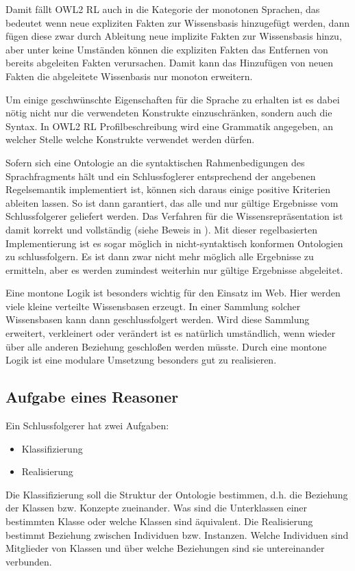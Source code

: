 Damit fällt OWL2 RL auch in die Kategorie der monotonen Sprachen, das bedeutet wenn neue expliziten Fakten zur Wissensbasis hinzugefügt werden, dann fügen diese zwar durch Ableitung neue implizite Fakten zur Wissensbasis hinzu, aber unter keine Umständen können die expliziten Fakten das Entfernen von bereits abgeleiten Fakten verursachen. Damit kann das Hinzufügen von neuen Fakten die abgeleitete Wissenbasis nur monoton erweitern.

Um einige geschwünschte Eigenschaften für die Sprache zu erhalten ist es dabei nötig nicht nur die verwendeten Konstrukte einzuschränken, sondern auch die Syntax. In OWL2 RL Profilbeschreibung wird eine Grammatik angegeben, an welcher Stelle welche Konstrukte verwendet werden dürfen.

Sofern sich eine Ontologie an die syntaktischen Rahmenbedigungen des Sprachfragments hält und ein Schlussfoglerer entsprechend der angebenen Regelsemantik implementiert ist, können sich daraus einige positive Kriterien ableiten lassen. So ist dann garantiert, das alle und nur gültige Ergebnisse vom Schlussfolgerer geliefert werden. Das Verfahren für die Wissensrepräsentation ist damit korrekt und vollständig (siehe Beweis in \cite{OWL2Profiles}).
Mit dieser regelbasierten Implementierung ist es sogar möglich in nicht-syntaktisch konformen Ontologien zu schlussfolgern. Es ist dann zwar nicht mehr möglich alle Ergebnisse zu ermitteln, aber es werden zumindest weiterhin nur gültige Ergebnisse abgeleitet.

Eine montone Logik ist besonders wichtig für den Einsatz im Web. Hier werden viele kleine verteilte Wissensbasen erzeugt. In einer Sammlung solcher Wissensbasen kann dann geschlussfolgert werden. Wird diese Sammlung erweitert, verkleinert oder verändert ist es natürlich umständlich, wenn wieder über alle anderen Beziehung geschloßen werden müsste. Durch eine montone Logik ist eine modulare Umsetzung besonders gut zu realisieren.

\subsection{Aufgabe eines Reasoner}
Ein Schlussfolgerer hat zwei Aufgaben:

\begin{itemize}
  \item Klassifizierung
  \item Realisierung
\end{itemize}

Die Klassifizierung soll die Struktur der Ontologie bestimmen, d.h. die Beziehung der Klassen bzw. Konzepte zueinander. Was sind die Unterklassen einer bestimmten Klasse oder welche Klassen sind äquivalent.
Die Realisierung bestimmt Beziehung zwischen Individuen bzw. Instanzen. Welche Individuen sind Mitglieder von Klassen und über welche Beziehungen sind sie untereinander verbunden.

